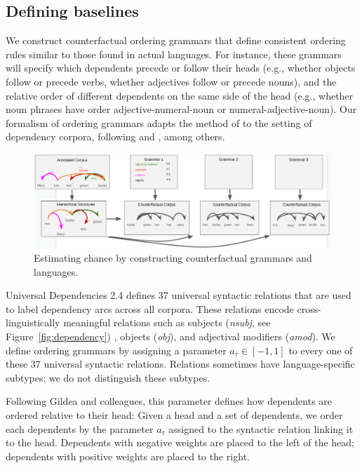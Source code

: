 \subsection{Defining baselines}

We construct counterfactual ordering grammars that define consistent ordering rules similar to those found in actual languages.
For instance, these grammars will specify which dependents precede or follow their heads (e.g., whether objects follow or precede verbs, whether adjectives follow or precede nouns), and the relative order of different dependents on the same side of the head (e.g., whether noun phrases have order adjective-numeral-noun or numeral-adjective-noun). Our formalism of ordering grammars adapts the method of \citet{gildea-optimizing-2007,gildea-grammars-2010,gildea-human-2015} to the setting of dependency corpora, following \citet{futrell-large-scale-2015} and \citet{hahn2020optimization}, among others.


\begin{figure}
\centering
\includegraphics[width=\textwidth]{figures-gdrive/counterfactual-languages.png}
	\caption{ Estimating chance by constructing counterfactual grammars and languages.}\label{fig:grammars}
\end{figure}


Universal Dependencies 2.4 defines 37 universal syntactic relations that are used to label dependency arcs across all corpora.
These relations encode cross-linguistically meaningful relations such as subjects (\textit{nsubj}, see Figure~\ref{fig:dependency}) , objects (\textit{obj}), and adjectival modifiers (\textit{amod}).
We define ordering grammars by assigning a parameter $a_\tau \in [-1,1]$ to every one of these 37 universal syntactic relations.
Relations sometimes have language-specific subtypes; we do not distinguish these subtypes.

Following Gildea and colleagues, this parameter defines how dependents are ordered relative to their head:
Given a head and a set of dependents, we order each dependents by the parameter $a_\tau$ assigned to the syntactic relation linking it to the head.
Dependents with negative weights are placed to the left of the head; dependents with positive weights are placed to the right.

